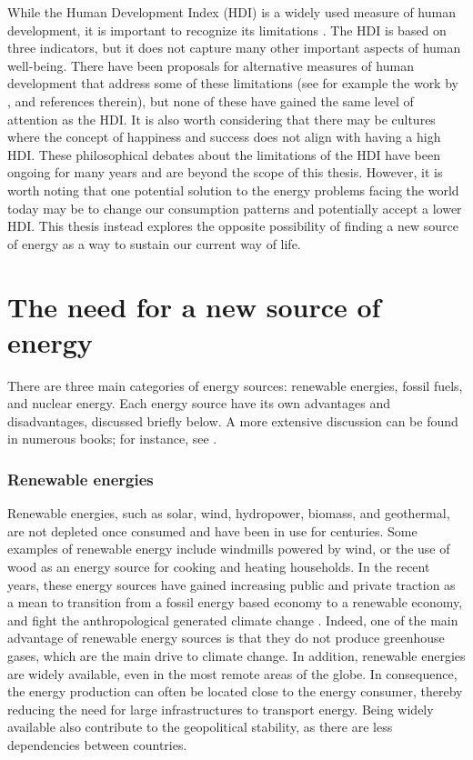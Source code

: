 \documentclass[my_thesis.tex]{subfiles}
\begin{document}
While the Human Development Index (HDI) is a widely used measure of human development, it is important to recognize its limitations \citep{mcgillivrayMeasuringDevelopmentUNDP1993a,bagolinHumanDevelopmentIndex2008,dervisMeasuringHumanProgress2011}. The HDI is based on three indicators, but it does not capture many other important aspects of human well-being. There have been proposals for alternative measures of human development that address some of these limitations (see for example the work by \citet{biggeriMoreSustainableHuman2018}, and references therein), but none of these have gained the same level of attention as the HDI. It is also worth considering that there may be cultures where the concept of happiness and success does not align with having a high HDI. These philosophical debates about the limitations of the HDI have been ongoing for many years and are beyond the scope of this thesis. However, it is worth noting that one potential solution to the energy problems facing the world today may be to change our consumption patterns and potentially accept a lower HDI. This thesis instead explores the opposite possibility of finding a new source of energy as a way to sustain our current way of life.

\section{The need for a new source of energy}

There are three main categories of energy sources: renewable energies, fossil fuels, and nuclear energy. Each energy source have its own advantages and disadvantages, discussed briefly below. A more extensive discussion can be found in numerous books; for instance, see \citet{parisiFutureFusionEnergy2018}.

\subsubsection{Renewable energies}
Renewable energies, such as solar, wind, hydropower, biomass, and geothermal, are not depleted once consumed and have been in use for centuries. Some examples of renewable energy include windmills powered by wind, or the use of wood as an energy source for cooking and heating households. In the recent years, these energy sources have gained increasing public and private traction as a mean to transition from a fossil energy based economy to a renewable economy, and fight the anthropological generated climate change \citep{allanIPCC2021Summary}. Indeed, one of the main advantage of renewable energy sources is that they do not produce greenhouse gases, which are the main drive to climate change. In addition, renewable energies are widely available, even in the most remote areas of the globe. In consequence, the energy production can often be located close to the energy consumer, thereby reducing the need for large infrastructures to transport energy. Being widely available also contribute to the geopolitical stability, as there are less dependencies between countries.
\end{document}
